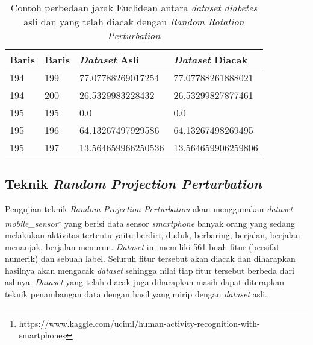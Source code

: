 \begin{table}
	\centering
	\caption{Contoh perbedaan jarak Euclidean antara \textit{dataset diabetes} asli dan yang telah diacak dengan \textit{Random Rotation Perturbation}}
	\begin{tabular}{ll|ll}
		\hline
		\textbf{Baris}&\textbf{Baris}&\textbf{\textit{Dataset} Asli}&\textbf{\textit{Dataset} Diacak}\\ \hline
		194&199&77.07788269017254&77.07788261888021\\
		194&200&26.5329983228432&26.53299827877461\\
		195&195&0.0&0.0\\
		195&196&64.13267497929586&64.13267498269495\\
		195&197&13.564659966250536&13.564659906259806\\
		\hline
	\end{tabular}
	\label{table:uji-rotation}
\end{table}

\subsection{Teknik \textit{Random Projection Perturbation}}
\label{subsec:rpp-fungsional}

Pengujian teknik \textit{Random Projection Perturbation} akan menggunakan \textit{dataset} \textit{mobile\_sensor}\footnote{https://www.kaggle.com/uciml/human-activity-recognition-with-smartphones} yang berisi data sensor \textit{smartphone} banyak orang yang sedang melakukan aktivitas tertentu yaitu berdiri, duduk, berbaring, berjalan, berjalan menanjak, berjalan menurun. \textit{Dataset} ini memiliki 561 buah fitur (bersifat numerik) dan sebuah label. Seluruh fitur tersebut akan diacak dan diharapkan hasilnya akan mengacak \textit{dataset} sehingga nilai tiap fitur tersebut berbeda dari aslinya. \textit{Dataset} yang telah diacak juga diharapkan masih dapat diterapkan teknik penambangan data dengan hasil yang mirip dengan \textit{dataset} asli.

